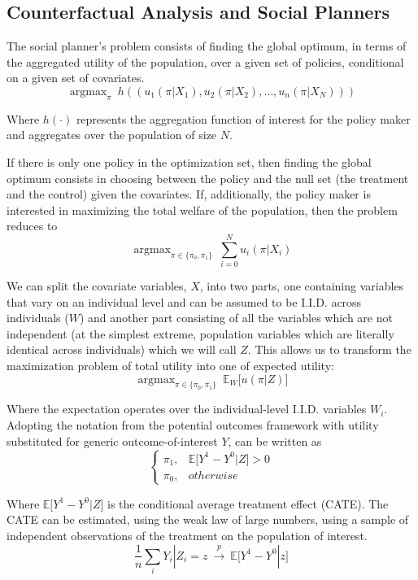 \documentclass[a4paper,12pt]{article}
\DeclareMathOperator*{\argmax}{argmax}
\begin{document}
\subsection*{Counterfactual Analysis and Social Planners}

The social planner's problem consists of finding the global optimum, in terms of the aggregated utility of the population, over a given set of policies, conditional on a given set of covariates.
%
$$
\argmax_{\pi} \  h((u_1(\pi | X_1), u_2(\pi | X_2),\dots, u_n(\pi | X_N)))
$$

Where $h(\cdot)$ represents the aggregation function of interest for the policy maker and aggregates over the population of size $N$.

If there is only one policy in the optimization set, then finding the global optimum consists in choosing between the policy and the null set (the treatment and the control) given the covariates. If, additionally, the policy maker is interested in maximizing the total welfare of the population, then the problem reduces to
%
$$
\argmax_{\pi \in \{\pi_0, \pi_1\}} \ \sum_{i=0}^N u_i(\pi | X_i)
$$

We can split the covariate variables, $X$, into two parts, one containing variables that vary on an individual level and can be assumed to be I.I.D. across individuals ($W$) and another part consisting of all the variables which are not independent (at the simplest extreme, population variables which are literally identical across individuals) which we will call $Z$. This allows us to transform the maximization problem of total utility into one of expected utility:
%
$$
\argmax_{\pi \in \{\pi_0, \pi_1\}} \ \mathbb{E}_W \big[ u(\pi | Z) \big]
$$

Where the expectation operates over the individual-level I.I.D. variables $W_i$. Adopting the notation from the potential outcomes framework with utility substituted for generic outcome-of-interest $Y$, can be written as
%
$$
\begin{cases}
\pi_1, & \mathbb{E}\big[ Y^1 - Y^0 | Z \big] > 0 \\
\pi_0, & otherwise
\end{cases}
$$

Where $\mathbb{E}\big[ Y^1 - Y^0 | Z \big]$ is the conditional average treatment effect (CATE). The CATE can be estimated, using the weak law of large numbers, using a sample of independent observations of the treatment on the population of interest.
%
$$
\frac{1}{n} \sum_i Y_i | Z_i=z \ \overset{p}{\to} \ \mathbb{E}\big[ Y^1 - Y^0 | z \big]
$$
\end{document}
